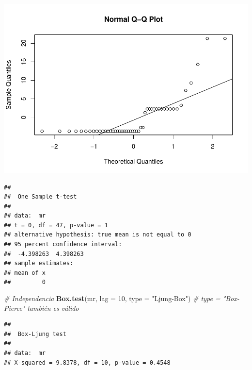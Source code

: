 \documentclass[
]{book}
\newenvironment{Shaded}{\begin{snugshade}}{\end{snugshade}}
\newcommand{\AttributeTok}[1]{\textcolor[rgb]{0.13,0.29,0.53}{#1}}
\newcommand{\CommentTok}[1]{\textcolor[rgb]{0.56,0.35,0.01}{\textit{#1}}}
\newcommand{\DecValTok}[1]{\textcolor[rgb]{0.00,0.00,0.81}{#1}}
\newcommand{\FunctionTok}[1]{\textcolor[rgb]{0.13,0.29,0.53}{\textbf{#1}}}
\newcommand{\NormalTok}[1]{#1}
\newcommand{\OtherTok}[1]{\textcolor[rgb]{0.56,0.35,0.01}{#1}}
\newcommand{\SpecialCharTok}[1]{\textcolor[rgb]{0.81,0.36,0.00}{\textbf{#1}}}
\newcommand{\StringTok}[1]{\textcolor[rgb]{0.31,0.60,0.02}{#1}}
\begin{document}
\includegraphics{_main_files/figure-latex/unnamed-chunk-21-1.pdf}

\begin{Shaded}
\end{Shaded}

\begin{verbatim}
## 
##  One Sample t-test
## 
## data:  mr
## t = 0, df = 47, p-value = 1
## alternative hypothesis: true mean is not equal to 0
## 95 percent confidence interval:
##  -4.398263  4.398263
## sample estimates:
## mean of x 
##         0
\end{verbatim}

\begin{Shaded}
\begin{Highlighting}[]
\CommentTok{\# Independencia}
\FunctionTok{Box.test}\NormalTok{(mr, }\AttributeTok{lag =} \DecValTok{10}\NormalTok{, }\AttributeTok{type =} \StringTok{"Ljung{-}Box"}\NormalTok{) }\CommentTok{\#  type = "Box{-}Pierce" también es válido}
\end{Highlighting}
\end{Shaded}

\begin{verbatim}
## 
##  Box-Ljung test
## 
## data:  mr
## X-squared = 9.8378, df = 10, p-value = 0.4548
\end{verbatim}
\end{document}
